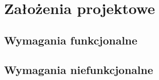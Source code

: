 \chapter{Założenia projektowe}
\label{chap:zalozenia-projektowe}
\section{Wymagania funkcjonalne}
\label{sec:wymagania-funkcjonalne}








\section{Wymagania niefunkcjonalne}
\label{sec:wymagania-niefunkcjonalne}


